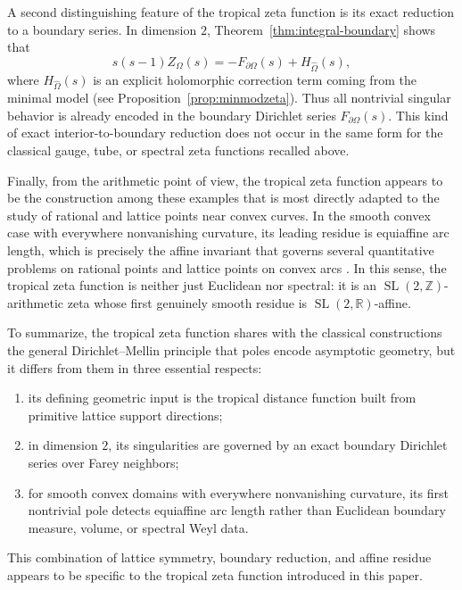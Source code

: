 \documentclass[a4paper,american,11pt]{amsart}
\theoremstyle{plain}
\theoremstyle{definition}
\newcommand{\Z}{\mathbb Z}
\newcommand{\R}{\mathbb R}
\let\ZZ\Z
\let\RR\R
\begin{document}
A second distinguishing feature of the tropical zeta function is its exact reduction to a boundary series. In dimension \(2\), Theorem~\ref{thm:integral-boundary} shows that
\[
s(s-1)Z_\Omega(s)=-F_{\partial\Omega}(s)+H_{\widehat\Omega}(s),
\]
where \(H_{\widehat\Omega}(s)\) is an explicit holomorphic correction term coming from the minimal model (see Proposition~\ref{prop:minmodzeta}). Thus all nontrivial singular behavior is already encoded in the boundary Dirichlet series \(F_{\partial\Omega}(s)\). This kind of exact interior-to-boundary reduction does not occur in the same form for the classical gauge, tube, or spectral zeta functions recalled above.

Finally, from the arithmetic point of view, the tropical zeta function appears to be the construction among these examples that is most directly adapted to the study of rational and lattice points near convex curves. In the smooth convex case with everywhere nonvanishing curvature, its leading residue is equiaffine arc length, which is precisely the affine invariant that governs several quantitative problems on rational points and lattice points on convex arcs \cite{Petrov2006,HowardTrifonov2022,Howard2023}. In this sense, the tropical zeta function is neither just Euclidean nor spectral: it is an \(\operatorname{SL}(2,\ZZ)\)-arithmetic zeta whose first genuinely smooth residue is \(\operatorname{SL}(2,\RR)\)-affine.

To summarize, the tropical zeta function shares with the classical constructions the general Dirichlet--Mellin principle that poles encode asymptotic geometry, but it differs from them in three essential respects:
\begin{enumerate}
\item its defining geometric input is the tropical distance function built from primitive lattice support directions;
\item in dimension \(2\), its singularities are governed by an exact boundary Dirichlet series over Farey neighbors;
\item for smooth convex domains with everywhere nonvanishing curvature, its first nontrivial pole detects equiaffine arc length rather than Euclidean boundary measure, volume, or spectral Weyl data.
\end{enumerate}

This combination of lattice symmetry, boundary reduction, and affine residue appears to be specific to the tropical zeta function introduced in this paper.
\end{document}
